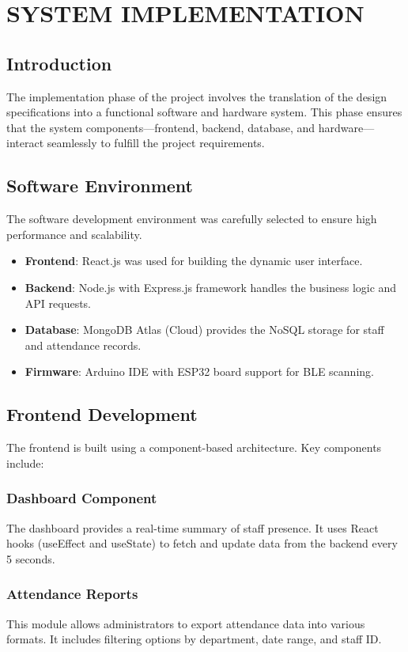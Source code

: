 \chapter{SYSTEM IMPLEMENTATION}

\section{Introduction}
The implementation phase of the project involves the translation of the design specifications into a functional software and hardware system. This phase ensures that the system components—frontend, backend, database, and hardware—interact seamlessly to fulfill the project requirements.

\section{Software Environment}
The software development environment was carefully selected to ensure high performance and scalability.
\begin{itemize}
    \item \textbf{Frontend}: React.js was used for building the dynamic user interface. 
    \item \textbf{Backend}: Node.js with Express.js framework handles the business logic and API requests.
    \item \textbf{Database}: MongoDB Atlas (Cloud) provides the NoSQL storage for staff and attendance records.
    \item \textbf{Firmware}: Arduino IDE with ESP32 board support for BLE scanning.
\end{itemize}

\section{Frontend Development}
The frontend is built using a component-based architecture. Key components include:
\subsection{Dashboard Component}
The dashboard provides a real-time summary of staff presence. It uses React hooks (useEffect and useState) to fetch and update data from the backend every 5 seconds.
\subsection{Attendance Reports}
This module allows administrators to export attendance data into various formats. It includes filtering options by department, date range, and staff ID.

